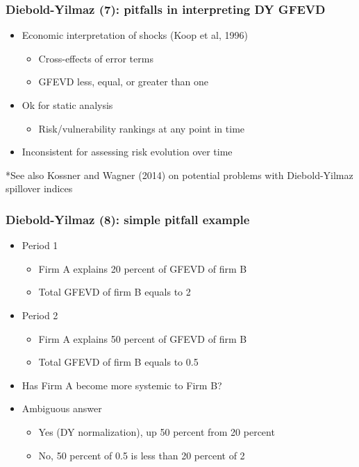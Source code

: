 \documentclass[aspectratio=43,dvipsnames,usenames, svgnames]{beamer}
\begin{document}
\begin{frame} %
\frametitle{Diebold-Yilmaz (7): pitfalls in interpreting DY GFEVD}
  \begin{itemize}
    \item Economic interpretation of shocks (Koop et al, 1996)
    \begin{itemize}
    	\item Cross-effects of error terms
    	\item GFEVD less, equal, or greater than one
    \end{itemize}
    \smallskip
    \item Ok for static analysis
    \begin{itemize}
    	\item Risk/vulnerability rankings at any point in time    	
    \end{itemize}
    \smallskip
    \item Inconsistent for assessing risk evolution over time   
  \end{itemize}
\vspace{.25cm}
\begin{flushleft}
	\tiny{*See also Kossner and Wagner (2014) on potential problems with Diebold-Yilmaz spillover indices}
\end{flushleft}  
\end{frame}

\begin{frame} %
\frametitle{Diebold-Yilmaz (8): simple pitfall example}
	\begin{itemize}
	  \item Period 1
	  	\begin{itemize}
	  		\item Firm A explains 20 percent of GFEVD of firm B
	  		\item Total GFEVD of firm B equals to 2
	  	\end{itemize}
	  \smallskip
	  \item Period 2
	  	\begin{itemize}
	  		\item Firm A explains 50 percent of GFEVD of firm B
	  		\item Total GFEVD of firm B equals to 0.5
	  	\end{itemize}	
	  \smallskip
	  \item Has Firm A become more systemic to Firm B?
	  \smallskip
	  \item Ambiguous answer
	  	\begin{itemize}
	  		\item Yes (DY normalization), up 50 percent from 20 percent
	  		\item No, 50 percent of 0.5 is less than 20 percent of 2
	  	\end{itemize}
	\end{itemize}
\end{frame}
\end{document}
